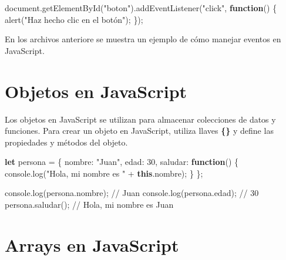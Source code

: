 \documentclass[
  a4paper,
  DIV=11,
  numbers=noendperiod,
  onepage,
  openany]{scrreprt}
\newenvironment{Shaded}{\begin{snugshade}}{\end{snugshade}}
\newcommand{\AttributeTok}[1]{\textcolor[rgb]{0.40,0.45,0.13}{#1}}
\newcommand{\BuiltInTok}[1]{\textcolor[rgb]{0.00,0.23,0.31}{#1}}
\newcommand{\CommentTok}[1]{\textcolor[rgb]{0.37,0.37,0.37}{#1}}
\newcommand{\DataTypeTok}[1]{\textcolor[rgb]{0.68,0.00,0.00}{#1}}
\newcommand{\DecValTok}[1]{\textcolor[rgb]{0.68,0.00,0.00}{#1}}
\newcommand{\FunctionTok}[1]{\textcolor[rgb]{0.28,0.35,0.67}{#1}}
\newcommand{\KeywordTok}[1]{\textcolor[rgb]{0.00,0.23,0.31}{\textbf{#1}}}
\newcommand{\NormalTok}[1]{\textcolor[rgb]{0.00,0.23,0.31}{#1}}
\newcommand{\OperatorTok}[1]{\textcolor[rgb]{0.37,0.37,0.37}{#1}}
\newcommand{\StringTok}[1]{\textcolor[rgb]{0.13,0.47,0.30}{#1}}
\begin{document}
\begin{tcolorbox}
\begin{Shaded}
\begin{Highlighting}[]
\BuiltInTok{document}\OperatorTok{.}\FunctionTok{getElementById}\NormalTok{(}\StringTok{"boton"}\NormalTok{)}\OperatorTok{.}\FunctionTok{addEventListener}\NormalTok{(}\StringTok{"click"}\OperatorTok{,} \KeywordTok{function}\NormalTok{() \{}
    \FunctionTok{alert}\NormalTok{(}\StringTok{"Haz hecho clic en el botón"}\NormalTok{)}\OperatorTok{;}
\NormalTok{\})}\OperatorTok{;}
\end{Highlighting}
\end{Shaded}

En los archivos anteriore se muestra un ejemplo de cómo manejar eventos
en JavaScript.

\section{Objetos en JavaScript}\label{objetos-en-javascript}

Los objetos en JavaScript se utilizan para almacenar colecciones de
datos y funciones. Para crear un objeto en JavaScript, utiliza llaves
\textbf{\{\}} y define las propiedades y métodos del objeto.

\begin{Shaded}
\begin{Highlighting}[]
\KeywordTok{let}\NormalTok{ persona }\OperatorTok{=}\NormalTok{ \{}
    \DataTypeTok{nombre}\OperatorTok{:} \StringTok{"Juan"}\OperatorTok{,}
    \DataTypeTok{edad}\OperatorTok{:} \DecValTok{30}\OperatorTok{,}
    \DataTypeTok{saludar}\OperatorTok{:} \KeywordTok{function}\NormalTok{() \{}
        \BuiltInTok{console}\OperatorTok{.}\FunctionTok{log}\NormalTok{(}\StringTok{"Hola, mi nombre es "} \OperatorTok{+} \KeywordTok{this}\OperatorTok{.}\AttributeTok{nombre}\NormalTok{)}\OperatorTok{;}
\NormalTok{    \}}
\NormalTok{\}}\OperatorTok{;}

\BuiltInTok{console}\OperatorTok{.}\FunctionTok{log}\NormalTok{(persona}\OperatorTok{.}\AttributeTok{nombre}\NormalTok{)}\OperatorTok{;} \CommentTok{// Juan}
\BuiltInTok{console}\OperatorTok{.}\FunctionTok{log}\NormalTok{(persona}\OperatorTok{.}\AttributeTok{edad}\NormalTok{)}\OperatorTok{;} \CommentTok{// 30}
\NormalTok{persona}\OperatorTok{.}\FunctionTok{saludar}\NormalTok{()}\OperatorTok{;} \CommentTok{// Hola, mi nombre es Juan}
\end{Highlighting}
\end{Shaded}

\section{Arrays en JavaScript}\label{arrays-en-javascript}


\end{tcolorbox}
\end{document}
